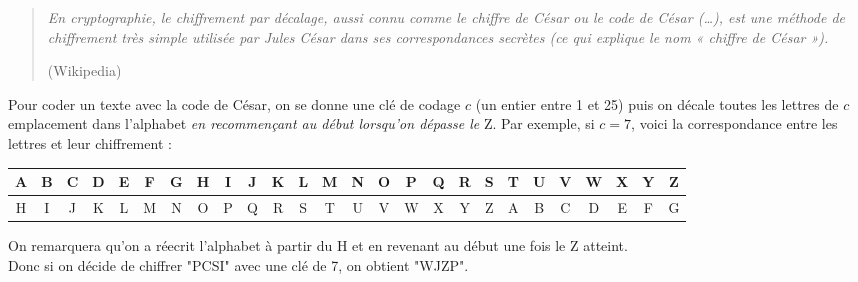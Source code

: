 \documentclass[11pt,a4paper]{article}
\begin{document}
\begin{Exercise}[title = {Chiffrement de César}]
    
    \begin{quote}
        \textit{En cryptographie, le chiffrement par décalage, aussi connu comme le chiffre de César ou le code de César (\dots), est une méthode de chiffrement très simple utilisée par Jules César dans ses correspondances secrètes (ce qui explique le nom « chiffre de César »). }
        \begin{flushright}
			(Wikipedia)
		\end{flushright}
    \end{quote}
    
    Pour coder un texte avec la code de César, on se donne une clé de codage $c$ (un entier entre 1 et 25) puis on décale toutes les lettres de $c$ emplacement dans l'alphabet \textit{en recommençant au début lorsqu'on dépasse le}  Z. Par exemple, si $c=7$, voici la correspondance entre les lettres et leur chiffrement : \medskip
    \begin{center}
    \begin{tabular}{|>{\small}c|>{\small}c|>{\small}c|>{\small}c|>{\small}c|>{\small}c|>{\small}c|>{\small}c|>{\small}c|>{\small}c|>{\small}c|>{\small}c|>{\small}c|>{\small}c|>{\small}c|>{\small}c|>{\small}c|>{\small}c|>{\small}c|>{\small}c|>{\small}c|>{\small}c|>{\small}c|>{\small}c|>{\small}c|>{\small}c|}
        \hline
        A & B & C & D & E & F & G & H & I & J & K & L & M & N & O & P & Q & R & S & T & U & V & W & X & Y & Z \\ 
        \hline
        H & I & J & K & L & M & N & O & P & Q & R & S & T & U & V & W & X & Y & Z & A & B & C & D & E & F & G \\
        \hline
    \end{tabular}
\end{center} 
    \medskip
    On remarquera qu'on a réecrit l'alphabet  à partir du {\sc H} et en revenant au début une fois le {\sc Z} atteint.\\
    Donc si on décide de chiffrer {\sc "PCSI"} avec une clé de 7, on obtient {\sc "WJZP"}.
    

\end{Exercise}
\end{document}
